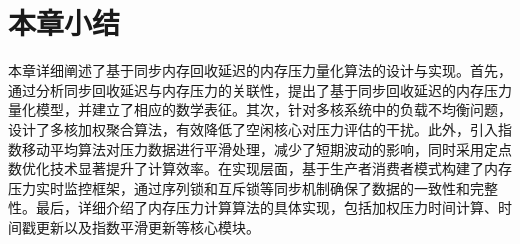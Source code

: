 \section{本章小结}
本章详细阐述了基于同步内存回收延迟的内存压力量化算法的设计与实现。首先，通过分析同步回收延迟与内存压力的关联性，提出了基于同步回收延迟的内存压力量化模型，并建立了相应的数学表征。其次，针对多核系统中的负载不均衡问题，设计了多核加权聚合算法，有效降低了空闲核心对压力评估的干扰。此外，引入指数移动平均算法对压力数据进行平滑处理，减少了短期波动的影响，同时采用定点数优化技术显著提升了计算效率。在实现层面，基于生产者消费者模式构建了内存压力实时监控框架，通过序列锁和互斥锁等同步机制确保了数据的一致性和完整性。最后，详细介绍了内存压力计算算法的具体实现，包括加权压力时间计算、时间戳更新以及指数平滑更新等核心模块。